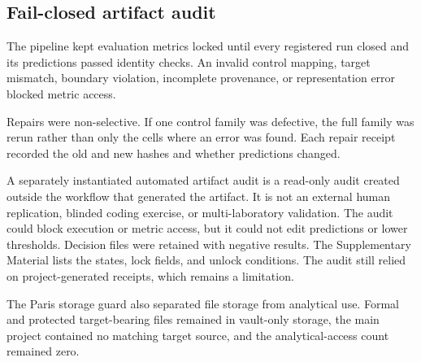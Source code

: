 \subsection{Fail-closed artifact audit}
\label{sec:methods-failclosed}

The pipeline kept evaluation metrics locked until every registered run closed and its predictions passed identity checks.  An invalid control mapping, target mismatch, boundary violation, incomplete provenance, or representation error blocked metric access.

Repairs were non-selective.  If one control family was defective, the full family was rerun rather than only the cells where an error was found.  Each repair receipt recorded the old and new hashes and whether predictions changed.

A separately instantiated automated artifact audit is a read-only audit created outside the workflow that generated the artifact.  It is not an external human replication, blinded coding exercise, or multi-laboratory validation.  The audit could block execution or metric access, but it could not edit predictions or lower thresholds.  Decision files were retained with negative results.  The Supplementary Material lists the states, lock fields, and unlock conditions.  The audit still relied on project-generated receipts, which remains a limitation.

The Paris storage guard also separated file storage from analytical use.  Formal and protected target-bearing files remained in vault-only storage, the main project contained no matching target source, and the analytical-access count remained zero.
